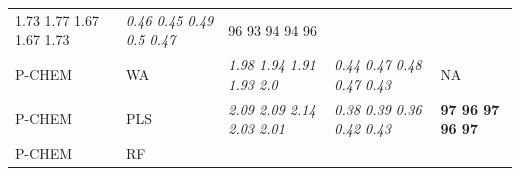\documentclass[utf8]{frontiersHLTH} %
\begin{document}
\begin{longtable}[]{@{}lllll@{}}
\begin{minipage}[t]{0.19\columnwidth}
1.73 1.77 1.67 1.67 1.73\strut
\end{minipage} & \begin{minipage}[t]{0.19\columnwidth}\raggedright\strut
\emph{0.46 0.45 0.49 0.5 0.47}\strut
\end{minipage} & \begin{minipage}[t]{0.27\columnwidth}\raggedright\strut
96 93 94 94 96\strut
\end{minipage}\tabularnewline
\begin{minipage}[t]{0.13\columnwidth}\raggedright\strut
P-CHEM\strut
\end{minipage} & \begin{minipage}[t]{0.08\columnwidth}\raggedright\strut
WA\strut
\end{minipage} & \begin{minipage}[t]{0.19\columnwidth}\raggedright\strut
\emph{1.98 1.94 1.91 1.93 2.0}\strut
\end{minipage} & \begin{minipage}[t]{0.19\columnwidth}\raggedright\strut
\emph{0.44 0.47 0.48 0.47 0.43}\strut
\end{minipage} & \begin{minipage}[t]{0.27\columnwidth}\raggedright\strut
NA\strut
\end{minipage}\tabularnewline
\begin{minipage}[t]{0.13\columnwidth}\raggedright\strut
P-CHEM\strut
\end{minipage} & \begin{minipage}[t]{0.08\columnwidth}\raggedright\strut
PLS\strut
\end{minipage} & \begin{minipage}[t]{0.19\columnwidth}\raggedright\strut
\emph{2.09 2.09 2.14 2.03 2.01}\strut
\end{minipage} & \begin{minipage}[t]{0.19\columnwidth}\raggedright\strut
\emph{0.38 0.39 0.36 0.42 0.43}\strut
\end{minipage} & \begin{minipage}[t]{0.27\columnwidth}\raggedright\strut
\textbf{97 96 97 96 97}\strut
\end{minipage}\tabularnewline
\begin{minipage}[t]{0.13\columnwidth}\raggedright\strut
P-CHEM\strut
\end{minipage} & \begin{minipage}[t]{0.08\columnwidth}\raggedright\strut
RF\strut
\end{minipage} & \begin{minipage}[t]{0.19\columnwidth}\raggedright\strut

\end{minipage}
\end{longtable}
\end{document}
